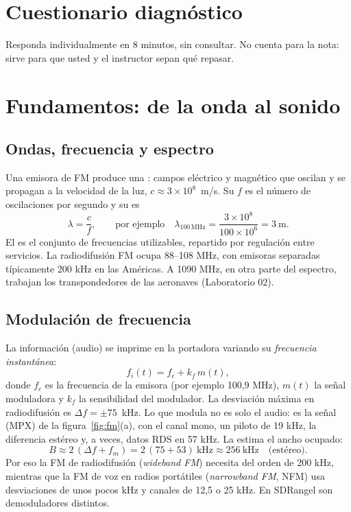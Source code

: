 \section{Cuestionario diagnóstico}
\label{sec:w-diag}

Responda individualmente en 8 minutos, sin consultar. No cuenta para la nota: sirve para que usted y el instructor sepan qué repasar.

\CuestionarioDiagnosticoW

\section{Fundamentos: de la onda al sonido}
\label{sec:w-fund}

\subsection{Ondas, frecuencia y espectro}

Una emisora de FM produce una : campos eléctrico y magnético que oscilan y se propagan a la velocidad de la luz, $c \approx 3\times10^{8}$~m/s. Su  $f$ es el número de oscilaciones por segundo y su  es
\begin{equation}
\lambda = \frac{c}{f}, \qquad \text{por ejemplo}\quad \lambda_{100\,\mathrm{MHz}} = \frac{3\times10^8}{100\times10^6} = 3~\mathrm{m}.
\end{equation}
El  es el conjunto de frecuencias utilizables, repartido por regulación entre servicios. La radiodifusión FM ocupa 88--108 MHz, con emisoras separadas típicamente 200 kHz en las Américas. A 1090 MHz, en otra parte del espectro, trabajan los transpondedores de las aeronaves (Laboratorio 02).

\subsection{Modulación de frecuencia}

La información (audio) se imprime en la portadora variando su \emph{frecuencia instantánea}:
\begin{equation}
f_i(t) = f_c + k_f\, m(t),
\end{equation}
donde $f_c$ es la frecuencia de la emisora (por ejemplo 100,9 MHz), $m(t)$ la señal moduladora y $k_f$ la sensibilidad del modulador. La desviación máxima en radiodifusión es $\Delta f = \pm 75$~kHz. Lo que modula no es solo el audio: es la señal  (MPX) de la figura~\ref{fig:fm}(a), con el canal mono, un piloto de 19 kHz, la diferencia estéreo y, a veces, datos RDS en 57 kHz. La  estima el ancho ocupado:
\begin{equation}
B \approx 2\,(\Delta f + f_m) = 2\,(75 + 53)~\text{kHz} \approx 256~\text{kHz}\quad\text{(estéreo)}.
\end{equation}
Por eso la FM de radiodifusión (\emph{wideband FM}) necesita del orden de 200 kHz, mientras que la FM de voz en radios portátiles (\emph{narrowband FM}, NFM) usa desviaciones de unos pocos kHz y canales de 12,5 o 25 kHz. En SDRangel son demoduladores distintos.

